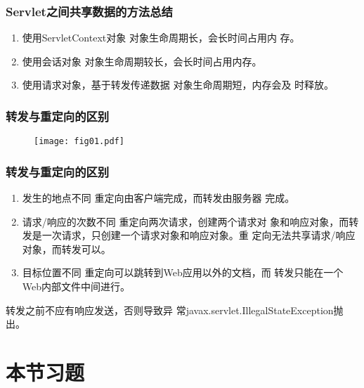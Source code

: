 \begin{frame}[fragile] %
  \frametitle{Servlet之间共享数据的方法总结} 

  \begin{enumerate}
  \item {\hei 使用ServletContext对象} 对象生命周期长，会长时间占用内
    存。
  \item {\hei 使用会话对象} 对象生命周期较长，会长时间占用内存。
  \item {\hei 使用请求对象，基于转发传递数据} 对象生命周期短，内存会及
    时释放。
  \end{enumerate}
\end{frame}

\begin{frame}[fragile] %
  \frametitle{转发与重定向的区别} 

  \begin{figure}
    \centering
    \texttt{[image: fig01.pdf]}
  \end{figure}
\end{frame}

\begin{frame}[fragile] %
  \frametitle{转发与重定向的区别} 

  \begin{enumerate}[<+-|alert@+>]
  \item {\hei 发生的地点不同} {\kai 重定向由客户端完成，而转发由服务器
      完成。}
  \item {\hei 请求/响应的次数不同} {\kai 重定向两次请求，创建两个请求对
      象和响应对象，而转发是一次请求，只创建一个请求对象和响应对象。重
      定向无法共享请求/响应对象，而转发可以。}
  \item {\hei 目标位置不同} {\kai 重定向可以跳转到Web应用以外的文档，而
      转发只能在一个Web内部文件中间进行。}
  \end{enumerate}


  转发之前不应有响应发送，否则导致异
  常javax.servlet.IllegalStateException抛出。
\end{frame}


\section{本节习题}

